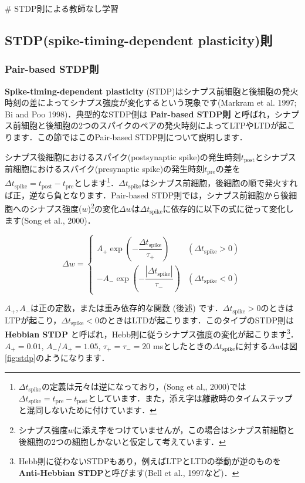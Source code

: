 # STDP則による教師なし学習
\subsection{STDP(spike-timing-dependent plasticity)則}
\subsubsection{Pair-based STDP則}
\textbf{Spike-timing-dependent plasticity} (STDP)はシナプス前細胞と後細胞の発火時刻の差によってシナプス強度が変化するという現象です(Markram et al. 1997; Bi and Poo 1998)．典型的なSTDP側は \textbf{Pair-based STDP則} と呼ばれ，シナプス前細胞と後細胞の2つのスパイクのペアの発火時刻によってLTPやLTDが起こります．この節ではこのPair-based STDP則について説明します．

シナプス後細胞におけるスパイク(postsynaptic spike)の発生時刻$t_\text{post}$とシナプス前細胞におけるスパイク(presynaptic spike)の発生時刻$t_\text{pre}$の差を$\Delta t_{\text{spike}}=t_\text{post}-t_\text{pre}$とします\footnote{$\Delta t_{\text{spike}}$の定義は元々は逆になっており，(Song et al,, 2000)では$\Delta t_{\text{spike}}=t_\text{pre}-t_\text{post}$としています．また，添え字は離散時のタイムステップと混同しないために付けています．}．$\Delta t_{\text{spike}}$はシナプス前細胞，後細胞の順で発火すれば正，逆なら負となります．Pair-based STDP則では，シナプス前細胞から後細胞へのシナプス強度($w$)\footnote{シナプス強度$w$に添え字をつけていませんが，この場合はシナプス前細胞と後細胞の2つの細胞しかないと仮定して考えています．}の変化$\Delta w$は$\Delta t_{\text{spike}}$に依存的に以下の式に従って変化します(Song et al., 2000)．


\begin{equation}
\Delta w = \begin{cases}
A_{+} \exp\left(-\dfrac{\Delta t_{\text{spike}}}{\tau_{+}}\right) &(\Delta t_{\text{spike}}> 0) \\
-A_{-} \exp\left(-\dfrac{|\Delta t_{\text{spike}}|}{\tau_{-}}\right) &(\Delta t_{\text{spike}}< 0)
\end{cases}
\end{equation}


$A_+, A_-$は正の定数，または重み依存的な関数 (後述) です．$\Delta t_{\text{spike}}>0$のときはLTPが起こり，$\Delta t_{\text{spike}}<0$のときはLTDが起こります．このタイプのSTDP則は\textbf{Hebbian STDP} と呼ばれ，Hebb則に従うシナプス強度の変化が起こります\footnote{Hebb則に従わないSTDPもあり，例えばLTPとLTDの挙動が逆のものを\textbf{Anti-Hebbian STDP}と呼びます(Bell et al., 1997など)．}．
$A_+=0.01$, $A_-/A_+=1.05$, $\tau_{+}=\tau_{-}=20$ msとしたときの$\Delta t_{\text{spike}}$に対する$\Delta w$は図\ref{fig:stdp}のようになります．

